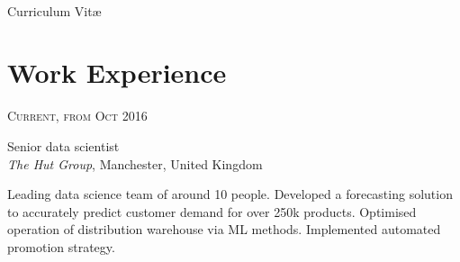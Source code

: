 \documentclass[10pt]{article} %
\begin{document}
\color{text1} %


\par{\\ %
{\color{headings} Curriculum {Vit\ae}\\[15pt]\par} %


\begin{minipage}[t]{0.58\textwidth} %
\vspace{0pt} %


\section{Work Experience}


{\raggedleft\textsc{Current, from Oct 2016}\par}

{\raggedright\large Senior data scientist\\
\textit{The Hut Group}, Manchester, United Kingdom\\[5pt]}

\normalsize{Leading data science team of around 10 people. 
Developed a forecasting solution to accurately predict customer demand for over 250k products.
Optimised operation of distribution warehouse via ML methods.
Implemented automated promotion strategy.}\\



\end{minipage}}
\end{document}
